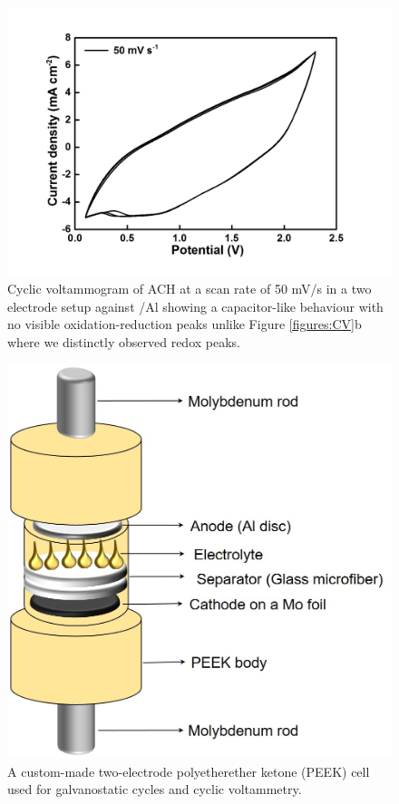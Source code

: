 \documentclass{article}
\begin{document}
\begin{figure}[tbh!]
  \centering
  \includegraphics[width=\textwidth]{SF/hair50mVs}
    \caption{Cyclic voltammogram of ACH at a scan rate of 50 mV/s in a two electrode setup against /Al showing a capacitor-like behaviour with no visible oxidation-reduction peaks unlike Figure \ref{figures:CV}b where we distinctly observed redox peaks.}
  \label{SF:hair50mVs}
\end{figure}
\begin{figure}[tbh!]
  \centering
  \includegraphics[width=\textwidth]{SF/PEEK}
    \caption{A custom-made two-electrode polyetherether ketone (PEEK) cell used for galvanostatic cycles and cyclic voltammetry.}
  \label{SF:PEEK}
\end{figure}
\end{document}
